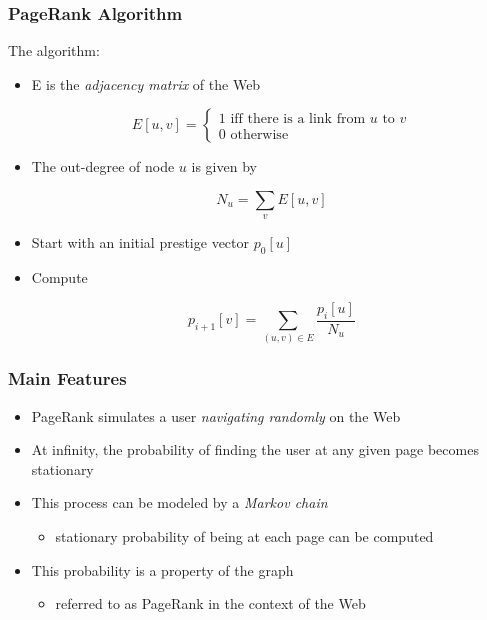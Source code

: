 \documentclass{beamer}
\begin{document}

\begin{frame}
  \frametitle{PageRank Algorithm}

  The algorithm:
  \begin{itemize}
  \item E is the \textit{adjacency matrix} of the Web
    \begin{block}{}
      \begin{displaymath}
        E[u,v] = \left\{
          \begin{array}{c}
            1 \text{ iff there is a link from $u$ to $v$} \\
            0 \text{ otherwise}
          \end{array}
        \right.
      \end{displaymath}
    \end{block}
  \item The out-degree of node $u$ is given by
    \begin{block}{}
      \begin{displaymath}
        N_u = \sum_v E[u,v]
      \end{displaymath}
    \end{block}
  \item Start with an initial prestige vector $p_0[u]$
  \item Compute
    \begin{block}{}
      \begin{displaymath}
        p_{i+1}[v] = \sum_{(u,v) \in E}\frac{p_i[u]}{N_u}
      \end{displaymath}
    \end{block}
  \end{itemize}
  
\end{frame}


\begin{frame}
    \frametitle{Main Features}
    \begin{itemize}
    \item PageRank simulates a user \emph{navigating randomly} on the Web
    \item At infinity, the probability of finding the user at any given page
        becomes stationary
    \item This process can be modeled by a \emph{Markov chain}
        \begin{itemize}
        \item stationary probability of being at each page can be computed
        \end{itemize}
    \item This probability is a property of the graph
        \begin{itemize}
        \item referred to as PageRank in the context of the Web
        \end{itemize}
    \end{itemize}
\end{frame}
\end{document}
